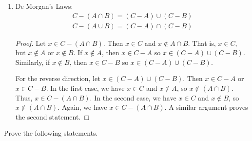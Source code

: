 \documentclass[class=report, crop=false]{standalone}
\begin{document}
\begin{solution}
\begin{enumerate}[label=({\alph*})]
      \item De Morgan's Laws:
      \begin{gather*}
        C - (A \cap B) = (C - A) \cup (C - B) \\
        C - (A \cup B) = (C - A) \cap (C - B)
      \end{gather*}

      \begin{proof}\renewcommand{\qedsymbol}{}
        Let \(x \in C - (A \cap B)\). Then \(x \in C\) and \(x \notin A \cap B\).
        That is, \(x \in C\), but \(x \notin A\) or \(x \notin B\). If \(x \notin A\), then \(x \in C - A\) so \(x \in (C - A) \cup (C - B)\).
        Similarly, if \(x \notin B\), then \(x \in C - B\) so \(x \in (C - A) \cup (C - B)\).

        For the reverse direction, let \(x \in (C - A) \cup (C - B)\). Then \(x \in C - A\) or \(x \in C - B\).
        In the first case, we have \(x \in C\) and \(x \notin A\), so \(x \notin (A \cap B)\). Thus, \(x \in C - (A \cap B)\).
        In the second case, we have \(x \in C\) and \(x \notin B\), so \(x \notin (A \cap B)\). Again, we have \(x \in C - (A \cap B)\). A similar argument proves the second statement.
      \end{proof}
    \end{enumerate}
  \end{solution}

  \begin{problem}
    Prove the following statements.
  \end{problem}
\end{document}
